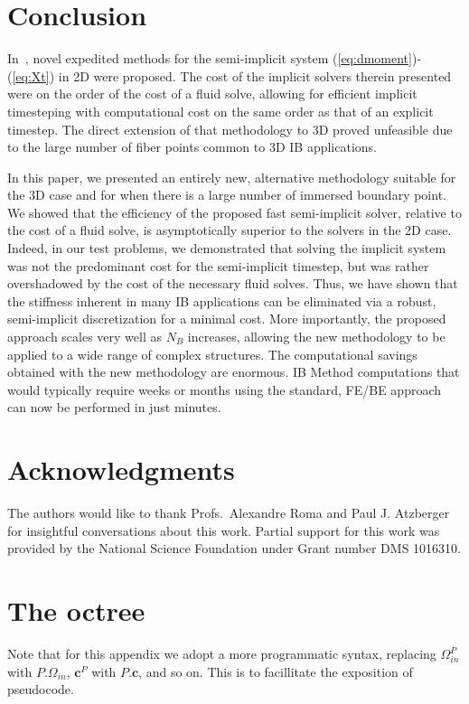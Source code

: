 \documentclass[preprint,12pt]{elsarticle}
\newcommand{\B}[1]{\mathbf{#1}}
\newcommand{\Panel}[1]{#1}
\begin{document}
\section{Conclusion}
\label{Sec:Conclusion}
In~\cite{IBM_Implicit2D}, novel expedited methods for  the semi-implicit system (\ref{eq:dmoment})-(\ref{eq:Xt}) in 2D were proposed. 
The cost of the implicit solvers therein presented were on the order of the cost of a fluid solve, allowing for efficient implicit timesteping with computational cost on the same order as that of an explicit timestep. The direct extension of that methodology to 3D proved unfeasible due to the large number of fiber points common to 3D IB applications.

In this paper, we presented an entirely new, alternative methodology suitable for the 3D case and for when there is a large number of immersed boundary point. We showed that the efficiency of the proposed  fast  semi-implicit solver,  relative to the cost of a fluid solve,  is asymptotically superior to the solvers in the 2D case. Indeed, in our test problems, we demonstrated that solving the implicit system was not the predominant cost for the semi-implicit timestep, but was rather overshadowed by the cost of the necessary fluid solves. Thus, we have  shown that the stiffness inherent in many IB applications can be eliminated via a  robust, semi-implicit discretization  for a minimal cost. More importantly, the proposed approach scales very well as $N_B$ increases, allowing the new methodology to be applied to a wide range of complex structures.
The computational savings obtained with the new methodology are enormous. IB Method computations that would typically require weeks or months using the  standard, FE/BE approach can now be performed in just minutes. 

\section*{Acknowledgments}
The authors would like to thank Profs.~Alexandre Roma and Paul J. Atzberger for insightful conversations about this work.  
Partial support for this work was provided by the National Science Foundation under Grant number DMS 1016310. 


\appendix
\section{The octree}
\label{App:octree}
Note that for this appendix we adopt a more programmatic syntax, replacing $\Omega_{in}^P$ with $\Panel{P}.\Omega_{in}$, $\B{c}^P$ with $\Panel{P}.\B{c}$, and so on. This is to facillitate the exposition of pseudocode.
\end{document}
